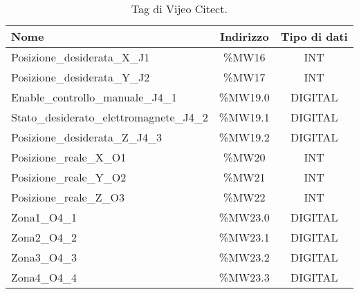 \begin{table*}[htbp]\centering
    \caption{Tag di Vijeo Citect.}
    \begin{tabular}{@{}lcc@{}}\toprule
        \textbf{Nome}                               & \textbf{Indirizzo} & \textbf{Tipo di dati} \\ \midrule
        Posizione\_desiderata\_X\_J1            & \%MW16       & INT                   \\
        Posizione\_desiderata\_Y\_J2            & \%MW17       & INT                   \\
        Enable\_controllo\_manuale\_J4\_1        & \%MW19.0     & DIGITAL               \\
        Stato\_desiderato\_elettromagnete\_J4\_2 & \%MW19.1     & DIGITAL               \\
        Posizione\_desiderata\_Z\_J4\_3          & \%MW19.2     & DIGITAL               \\
        Posizione\_reale\_X\_O1                 & \%MW20       & INT                   \\
        Posizione\_reale\_Y\_O2                 & \%MW21       & INT                   \\
        Posizione\_reale\_Z\_O3                 & \%MW22       & INT                   \\
        Zona1\_O4\_1                           & \%MW23.0     & DIGITAL               \\
        Zona2\_O4\_2                           & \%MW23.1     & DIGITAL               \\
        Zona3\_O4\_3                           & \%MW23.2     & DIGITAL               \\
        Zona4\_O4\_4                           & \%MW23.3     & DIGITAL               \\
    \bottomrule\end{tabular}
\end{table*}

\printbibliography



